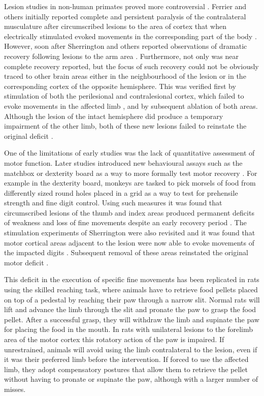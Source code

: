 Lesion studies in non-human primates proved more controversial \cite{Darling2011}. Ferrier and others initially reported complete and persistent paralysis of the contralateral musculature after circumscribed lesions to the area of cortex that when electrically stimulated evoked movements in the corresponding part of the body \cite{Ferrier1884}. However, soon after Sherrington and others reported observations of dramatic recovery following lesions to the arm area \cite{GrahamBrown1913,Leyton1917}. Furthermore, not only was near complete recovery reported, but the focus of such recovery could not be obviously traced to other brain areas either in the neighbourhood of the lesion or in the corresponding cortex of the opposite hemisphere. This was verified first by stimulation of both the perilesional and contralesional cortex, which failed to evoke movements in the affected limb \cite{Leyton1917}, and by subsequent ablation of both areas. Although the lesion of the intact hemisphere did produce a temporary impairment of the other limb, both of these new lesions failed to reinstate the original deficit \cite{GrahamBrown1913,Leyton1917}.

One of the limitations of early studies was the lack of quantitative assessment of motor function. Later studies introduced new behavioural assays such as the matchbox or dexterity board as a way to more formally test motor recovery \cite{Glees1950,Cole1952}. For example in the dexterity board, monkeys are tasked to pick morsels of food from differently sized round holes placed in a grid as a way to test for prehensile strength and fine digit control. Using such measures it was found that circumscribed lesions of the thumb and index areas produced permanent deficits of weakness and loss of fine movements despite an early recovery period \cite{Glees1950}. The stimulation experiments of Sherrington were also revisited and it was found that motor cortical areas adjacent to the lesion were now able to evoke movements of the impacted digits \cite{Glees1950}. Subsequent removal of these areas reinstated the original motor deficit \cite{Glees1950}.

This deficit in the execution of specific fine movements has been replicated in rats using the skilled reaching task, where animals have to retrieve food pellets placed on top of a pedestal by reaching their paw through a narrow slit. Normal rats will lift and advance the limb through the slit and pronate the paw to grasp the food pellet. After a successful grasp, they will withdraw the limb and supinate the paw for placing the food in the mouth. In rats with unilateral lesions to the forelimb area of the motor cortex this rotatory action of the paw is impaired. If unrestrained, animals will avoid using the limb contralateral to the lesion, even if it was their preferred limb before the intervention. If forced to use the affected limb, they adopt compensatory postures that allow them to retrieve the pellet without having to pronate or supinate the paw, although with a larger number of misses.

